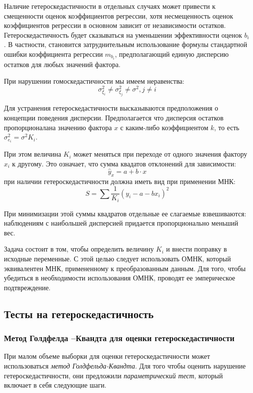\documentclass[aps,%
12pt,%
final,%
oneside,
onecolumn,%
musixtex, %
superscriptaddress,%
centertags]{article} %
\theoremstyle{plain}
\theoremstyle{definition}
\theoremstyle{remark}
\begin{document}
Наличие гетероскедастичности в отдельных случаях может привести к смещенности оценок коэффициентов регрессии, хотя несмещенность оценок коэффициентов регрессии в основном зависит от независимости остатков. Гетероскедастичность будет сказываться на уменьшении эффективности оценок $b_i$. В частности, становится затруднительным использование формулы стандартной ошибки коэффициента регрессии $m_{b_i}$, предполагающий единую дисперсию остатков для любых значений фактора.

При нарушении гомоскедастичности мы имеем неравенства:
$$\sigma_{\xi_i}^2 \neq \sigma_{\xi_j}^2 \neq \sigma^2, j \neq i$$

Для устранения гетероскедастичности высказываются предположения о концепции поведения дисперсии. Предполагается что дисперсия остатков пропорционалана значению фактора $x$ с каким-либо коэффициентом $k$, то есть $\sigma_{e_i}^2 = \sigma^2K_i$.

При этом величина $K_i$ может меняться при переходе от одного значения фактору $x_i$ к другому. Это означает, что сумма квадатов отклонений для зависимости:
$$\hat{y}_x = a + b \cdot x$$
при наличии гетероскедастичности должна иметь вид при применении МНК:
$$ S = \sum \frac{1}{K_i}(y_i - a - bx_i)^2$$

При минимизации этой суммы квадратов отдельные ее слагаемые взвешиваются: наблюдениям с наибольшей дисперсией придается пропорционально меньший вес.

Задача состоит в том, чтобы определить величину $K_i$ и внести поправку в исходные переменные. С этой целью следует использовать ОМНК, который эквивалентен МНК, примененному к преобразованным данным. Для того, чтобы убедиться в необходимости использования ОМНК, проводят ее эмперическое подтвреждение.

\newpage
\subsection{Тесты на гетероскедастичность}

\subsubsection{Метод Голдфелда –Квандта для оценки гетероскедастичности}

При малом объеме выборки для оценки гетероскедастичности может использоваться \textit{метод Голдфельда-Квандта}. Для того чтобы оценить нарушение гетероскедастичности, они предложили \textit{параметрический тест}, который включает в себя следующие шаги.
\end{document}
